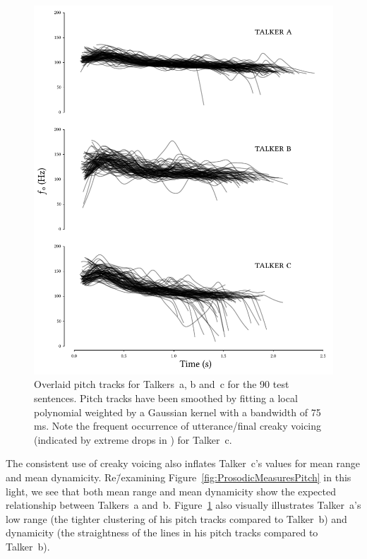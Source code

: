 \begin{figure}[pbt]
	\begin{centering}
	\includegraphics{figures/posthocs/PitchTracks.pdf}
	\caption[Pitch track overlays of the test sentences]{Overlaid pitch tracks for Talkers~\ac{a}, \ac{b} and~\ac{c} for the 90 test sentences.  Pitch tracks have been smoothed by fitting a local polynomial weighted by a Gaussian kernel with a bandwidth of 75 ms.  Note the frequent occurrence of utterance\-/final creaky voicing (indicated by extreme drops in \fo) for Talker~\ac{c}.\label{fig:PitchTracks}}
	\end{centering}
\end{figure}

The consistent use of creaky voicing also inflates Talker~\ac{c}’s values for mean \fo{} range and mean \fo{} dynamicity.  Re\=/examining Figure~\ref{fig:ProsodicMeasuresPitch} in this light, we see that both mean \fo{} range and mean \fo{} dynamicity show the expected relationship between Talkers~\ac{a} and~\ac{b}.  Figure~\ref{fig:PitchTracks} also visually illustrates Talker~\ac{a}’s low \fo{} range (the tighter clustering of his pitch tracks compared to Talker~\ac{b}) and dynamicity (the straightness of the lines in his pitch tracks compared to Talker~\ac{b}).

